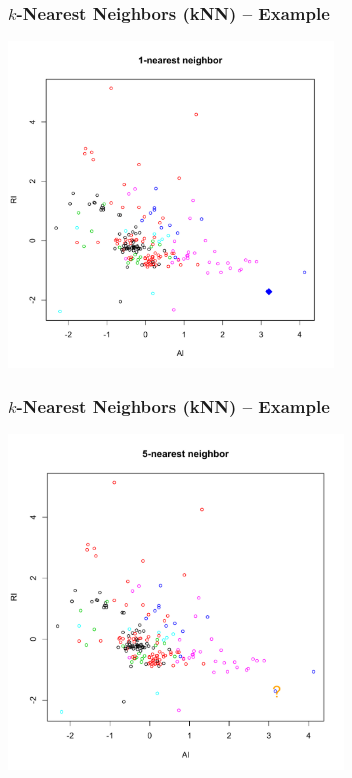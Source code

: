 \documentclass[flegn]{beamer}
\begin{document}
\begin{frame}
\frametitle{$k$-Nearest Neighbors (kNN) -- Example}

\vspace{-0.5cm}

\begin{center}
\includegraphics[width=3.4in]{knn2}
\end{center}

\end{frame}

\begin{frame}
\frametitle{$k$-Nearest Neighbors (kNN) -- Example}

\vspace{-0.5cm}

\begin{center}
\includegraphics[width=3.5in]{knn3}
\end{center}

\end{frame}
\end{document}

